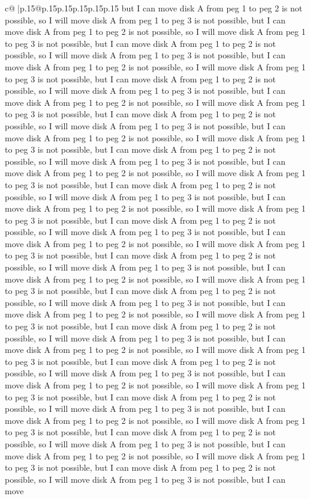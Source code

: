 \documentclass{article}
\begin{document}
{\begin{supertabular}{c@{$\;$}|p{.15\linewidth}@{}p{.15\linewidth}p{.15\linewidth}p{.15\linewidth}p{.15\linewidth}p{.15\linewidth}}
{{{but I can move disk A from peg 1 to peg 2 is not possible, so I will move disk A from peg 1 to peg 3 is not possible, but I can move disk A from peg 1 to peg 2 is not possible, so I will move disk A from peg 1 to peg 3 is not possible, but I can move disk A from peg 1 to peg 2 is not possible, so I will move disk A from peg 1 to peg 3 is not possible, but I can move disk A from peg 1 to peg 2 is not possible, so I will move disk A from peg 1 to peg 3 is not possible, but I can move disk A from peg 1 to peg 2 is not possible, so I will move disk A from peg 1 to peg 3 is not possible, but I can move disk A from peg 1 to peg 2 is not possible, so I will move disk A from peg 1 to peg 3 is not possible, but I can move disk A from peg 1 to peg 2 is not possible, so I will move disk A from peg 1 to peg 3 is not possible, but I can move disk A from peg 1 to peg 2 is not possible, so I will move disk A from peg 1 to peg 3 is not possible, but I can move disk A from peg 1 to peg 2 is not possible, so I will move disk A from peg 1 to peg 3 is not possible, but I can move disk A from peg 1 to peg 2 is not possible, so I will move disk A from peg 1 to peg 3 is not possible, but I can move disk A from peg 1 to peg 2 is not possible, so I will move disk A from peg 1 to peg 3 is not possible, but I can move disk A from peg 1 to peg 2 is not possible, so I will move disk A from peg 1 to peg 3 is not possible, but I can move disk A from peg 1 to peg 2 is not possible, so I will move disk A from peg 1 to peg 3 is not possible, but I can move disk A from peg 1 to peg 2 is not possible, so I will move disk A from peg 1 to peg 3 is not possible, but I can move disk A from peg 1 to peg 2 is not possible, so I will move disk A from peg 1 to peg 3 is not possible, but I can move disk A from peg 1 to peg 2 is not possible, so I will move disk A from peg 1 to peg 3 is not possible, but I can move disk A from peg 1 to peg 2 is not possible, so I will move disk A from peg 1 to peg 3 is not possible, but I can move disk A from peg 1 to peg 2 is not possible, so I will move disk A from peg 1 to peg 3 is not possible, but I can move disk A from peg 1 to peg 2 is not possible, so I will move disk A from peg 1 to peg 3 is not possible, but I can move disk A from peg 1 to peg 2 is not possible, so I will move disk A from peg 1 to peg 3 is not possible, but I can move disk A from peg 1 to peg 2 is not possible, so I will move disk A from peg 1 to peg 3 is not possible, but I can move disk A from peg 1 to peg 2 is not possible, so I will move disk A from peg 1 to peg 3 is not possible, but I can move disk A from peg 1 to peg 2 is not possible, so I will move disk A from peg 1 to peg 3 is not possible, but I can move disk A from peg 1 to peg 2 is not possible, so I will move disk A from peg 1 to peg 3 is not possible, but I can move disk A from peg 1 to peg 2 is not possible, so I will move disk A from peg 1 to peg 3 is not possible, but I can move disk A from peg 1 to peg 2 is not possible, so I will move disk A from peg 1 to peg 3 is not possible, but I can move disk A from peg 1 to peg 2 is not possible, so I will move disk A from peg 1 to peg 3 is not possible, but I can move }}}
\end{supertabular}}
\end{document}

